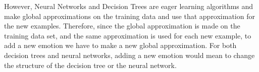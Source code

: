 \documentclass[a4paper,12pt,oneside,final]{report}
\begin{document}
\begin{enumerate}
However, Neural Networks and Decision Trees are eager learning algorithms and make global approximations on the training data and use that approximation for the new examples. Therefore, since the global approximation is made on the training data set, and the same approximation is used for each new example, to add a new emotion we have to make a new global approximation.  For both decision trees and neural networks, adding a new emotion would mean to change the structure of the decision tree or the neural network.
\end{enumerate}




\begin{appendices}

\end{appendices}
\end{document}
